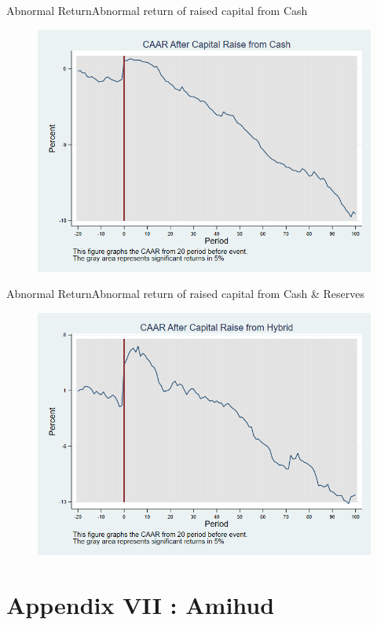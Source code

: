 \documentclass{beamer}
\begin{document}
\begin{frame}{Abnormal Return}{Abnormal return of raised capital from Cash}
	\label{car_marketindustryCash}
	\begin{figure}
		\centering
		\includegraphics[width=0.65\linewidth]{Output/car_marketindustryCash}
		\label{fig:car_marketindustryCash}
	\end{figure}
\end{frame}


\begin{frame}{Abnormal Return}{Abnormal return of raised capital from Cash \& Reserves}
	\label{car_marketindustryHybrid}
	\begin{figure}
		\centering
		\includegraphics[width=0.65\linewidth]{Output/car_marketindustryHybrid}
		\label{fig:car_marketindustryHybrid}
	\end{figure}
\end{frame}

					


\section{Appendix VII : Amihud}
\end{document}
